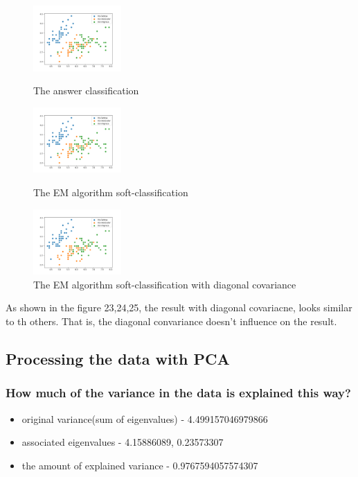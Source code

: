 \documentclass[a4paper]{article}
\begin{document}
	\begin{figure}[h]
		\begin{center}
			\includegraphics[width=0.3\textwidth]{4_answer.png}
			\caption{The answer classification}
			\includegraphics[width=0.3\textwidth]{4class.png}
			\caption{The EM algorithm soft-classification}
			\includegraphics[width=0.3\textwidth]{4_cov0.png}
			\caption{The EM algorithm soft-classification with diagonal covariance}
		\end{center}
	\end{figure}
	
	As shown in the figure 23,24,25, the result with diagonal covariacne, looks similar to th others. That is, the diagonal convariance doesn't influence on the result.
        \clearpage
	\subsection{Processing the data with PCA }
	\subsubsection{How much of the variance in the data is explained this way?}
        \begin{itemize}
          \item original variance(sum of eigenvalues) -  4.499157046979866
          \item associated eigenvalues - 4.15886089, 0.23573307
          \item the amount of explained variance - 0.9767594057574307
        \end{itemize}
\end{document}
